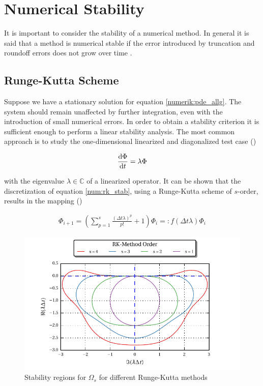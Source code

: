 \section{Numerical Stability}

It is important to consider the stability of a numerical method. In general it is said that a method is numerical stable if the error
introduced by truncation and roundoff errors does not grow over time \citep{ferziger99}.\\

\subsection{Runge-Kutta Scheme}

Suppose we have a stationary solution for equation \ref{numerik:pde_allg}.
The system should remain unaffected by further integration, even with the introduction of small numerical errors.
In order to obtain a stability criterion it is sufficient enough to perform a linear stability analysis.
The most common approach is to study the one-dimensional linearized and diagonalized test case (\citep{BLABLA})

\begin{align}
\label{num:rk_stab}
\frac{\mathop{}\!\mathrm{d} \Phi}{\mathop{}\!\mathrm{d} t} = \lambda \Phi
\end{align}

with the eigenvalue $\lambda \in \mathbb{C}$ of a linearized operator.
It can be shown that the discretization of equation \ref{num:rk_stab}, using a Runge-Kutta scheme of $s$-order,
results in  the mapping (\citep{BLABLA})

\begin{align}
    \Phi_{i+1}  = \left(\sum_{p=1}^s \frac{(\Delta t \lambda)^p}{p!}  + 1 \right) \Phi_i =: f(\Delta t\lambda)\Phi_i
\end{align}

\begin{figure}[!tp]
  \begin{minipage}[c]{0.6\textwidth}
      \includegraphics{gfx/numerik/rk_stability.pdf}
  \end{minipage}\hfill
  \begin{minipage}[c]{0.3\textwidth}
  \caption{Stability regions for $\Omega_s$ for different Runge-Kutta methods}
  \label{fig:num_rkstab}
  \end{minipage}
\end{figure}

